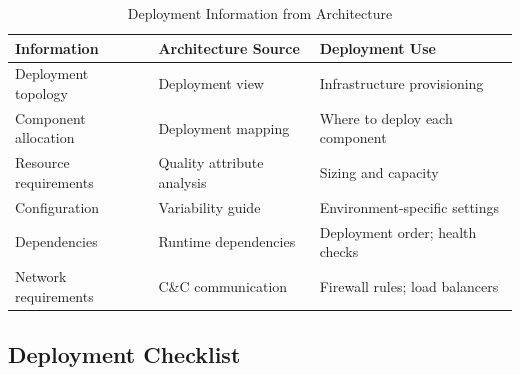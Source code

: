 \documentclass[11pt]{article}
\begin{document}
\begin{longtable}{@{}L{3cm} L{4.5cm} L{5cm}@{}}
\caption{Deployment Information from Architecture} \\
\toprule
\textbf{Information} & \textbf{Architecture Source} & \textbf{Deployment Use} \\
\midrule
\endfirsthead
\bottomrule
\endlastfoot
Deployment topology & Deployment view & Infrastructure provisioning \\
Component allocation & Deployment mapping & Where to deploy each component \\
Resource requirements & Quality attribute analysis & Sizing and capacity \\
Configuration & Variability guide & Environment-specific settings \\
Dependencies & Runtime dependencies & Deployment order; health checks \\
Network requirements & C\&C communication & Firewall rules; load balancers \\
\end{longtable}

\subsection{Deployment Checklist}
\end{document}
